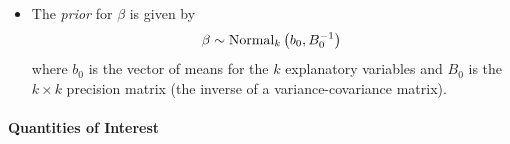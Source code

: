 \documentclass[letterpaper,10pt,english]{sphinxmanual}
\begin{document}
\begin{itemize}
\item {} 
The \emph{prior} for \(\beta\) is given by
\begin{gather}
\begin{split}\begin{aligned}
\beta \sim \textrm{Normal}_k\left(  b_{0},B_{0}^{-1}\right)\end{aligned}\end{split}\notag
\end{gather}
where \(b_{0}\) is the vector of means for the \(k\)
explanatory variables and \(B_{0}\) is the \(k \times k\)
precision matrix (the inverse of a variance-covariance matrix).

\end{itemize}


\paragraph{Quantities of Interest}
\end{document}
